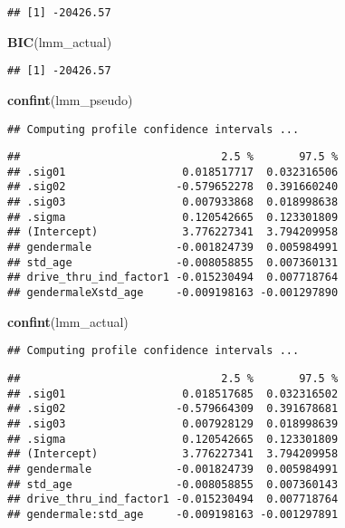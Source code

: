\documentclass[
]{article}
\newenvironment{Shaded}{\begin{snugshade}}{\end{snugshade}}
\newcommand{\FunctionTok}[1]{\textcolor[rgb]{0.13,0.29,0.53}{\textbf{#1}}}
\newcommand{\NormalTok}[1]{#1}
\begin{document}
\begin{verbatim}
## [1] -20426.57
\end{verbatim}

\begin{Shaded}
\begin{Highlighting}[]
\FunctionTok{BIC}\NormalTok{(lmm\_actual)}
\end{Highlighting}
\end{Shaded}

\begin{verbatim}
## [1] -20426.57
\end{verbatim}

\begin{Shaded}
\begin{Highlighting}[]
\FunctionTok{confint}\NormalTok{(lmm\_pseudo)}
\end{Highlighting}
\end{Shaded}

\begin{verbatim}
## Computing profile confidence intervals ...
\end{verbatim}

\begin{verbatim}
##                               2.5 %       97.5 %
## .sig01                  0.018517717  0.032316506
## .sig02                 -0.579652278  0.391660240
## .sig03                  0.007933868  0.018998638
## .sigma                  0.120542665  0.123301809
## (Intercept)             3.776227341  3.794209958
## gendermale             -0.001824739  0.005984991
## std_age                -0.008058855  0.007360131
## drive_thru_ind_factor1 -0.015230494  0.007718764
## gendermaleXstd_age     -0.009198163 -0.001297890
\end{verbatim}

\begin{Shaded}
\begin{Highlighting}[]
\FunctionTok{confint}\NormalTok{(lmm\_actual)}
\end{Highlighting}
\end{Shaded}

\begin{verbatim}
## Computing profile confidence intervals ...
\end{verbatim}

\begin{verbatim}
##                               2.5 %       97.5 %
## .sig01                  0.018517685  0.032316502
## .sig02                 -0.579664309  0.391678681
## .sig03                  0.007928129  0.018998639
## .sigma                  0.120542665  0.123301809
## (Intercept)             3.776227341  3.794209958
## gendermale             -0.001824739  0.005984991
## std_age                -0.008058855  0.007360143
## drive_thru_ind_factor1 -0.015230494  0.007718764
## gendermale:std_age     -0.009198163 -0.001297891
\end{verbatim}
\end{document}
